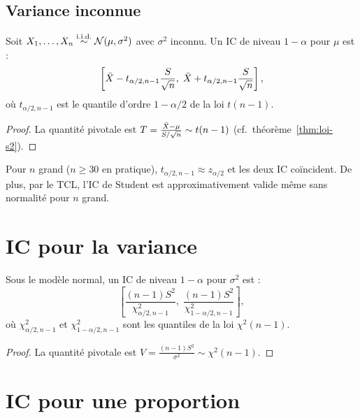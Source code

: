 \subsection{Variance inconnue}

\begin{theoreme}
\label{thm:ic-student}
Soit $X_1,\ldots,X_n\overset{\text{i.i.d.}}{\sim}\mathcal{N}(\mu,\sigma^2)$ avec $\sigma^2$ inconnu. Un IC de niveau $1-\alpha$ pour $\mu$ est :
\[
\left[\bar{X} - t_{\alpha/2,n-1}\frac{S}{\sqrt{n}},\;\bar{X} + t_{\alpha/2,n-1}\frac{S}{\sqrt{n}}\right],
\]
o\`u $t_{\alpha/2,n-1}$ est le quantile d'ordre $1-\alpha/2$ de la loi $t(n-1)$.
\end{theoreme}

\begin{proof}
La quantit\'e pivotale est $T=\frac{\bar{X}-\mu}{S/\sqrt{n}}\sim t(n-1)$ (cf.\ th\'eor\`eme~\ref{thm:loi-s2}).
\end{proof}

\begin{remarque}
Pour $n$ grand ($n\geq 30$ en pratique), $t_{\alpha/2,n-1}\approx z_{\alpha/2}$ et les deux IC co\"incident. De plus, par le TCL, l'IC de Student est approximativement valide m\^eme sans normalit\'e pour $n$ grand.
\end{remarque}

\section{IC pour la variance}

\begin{theoreme}
Sous le mod\`ele normal, un IC de niveau $1-\alpha$ pour $\sigma^2$ est :
\[
\left[\frac{(n-1)S^2}{\chi^2_{\alpha/2,n-1}},\;\frac{(n-1)S^2}{\chi^2_{1-\alpha/2,n-1}}\right],
\]
o\`u $\chi^2_{\alpha/2,n-1}$ et $\chi^2_{1-\alpha/2,n-1}$ sont les quantiles de la loi $\chi^2(n-1)$.
\end{theoreme}

\begin{proof}
La quantit\'e pivotale est $V=\frac{(n-1)S^2}{\sigma^2}\sim\chi^2(n-1)$.
\end{proof}

\section{IC pour une proportion}

